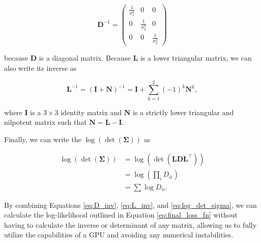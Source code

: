 \begin{equation}
\boldsymbol{D}^{-1}=\left(\begin{array}{ccc}
\frac{1}{\sigma_{1}^{2}} & 0 & 0 \\
0 & \frac{1}{\sigma_{2}^{2}} & 0 \\
0 & 0 & \frac{1}{\sigma_{3}^{2}}
\end{array}\right)
\label{eq:D_inv}
\end{equation}

\noindent
because $\boldsymbol{D}$ is a diagonal matrix. Because $\boldsymbol{L}$ is a lower triangular matrix, we can also write its inverse as  

\begin{equation}
\boldsymbol{L}^{-1}=(\boldsymbol{I}+\boldsymbol{N})^{-1}= \boldsymbol{I} +\sum_{k=1}^{2}(-1)^{k} \boldsymbol{N}^{k} ,
\label{eq:L_inv}
\end{equation}

\noindent
where $\boldsymbol{I}$ is a $3\times3$ identity matrix and $\boldsymbol{N}$ is a strictly lower triangular and nilpotent matrix such that $\boldsymbol{N} = \boldsymbol{L} - \boldsymbol{I}$.

Finally, we can write the $\log (\operatorname{det}(\boldsymbol{\Sigma}))$ as

\begin{equation}
\begin{split}
\log (\operatorname{det}(\boldsymbol{\Sigma})) 
& = \log (\operatorname{det} (\boldsymbol{L}\boldsymbol{D}\boldsymbol{L}^{\top})) \\
& = \log (\prod_i D_{ii}) \\
& = \sum \log D_{ii} .
\end{split}
\label{eq:log_det_sigma}
\end{equation}

\noindent
By combining Equations \ref{eq:D_inv}, \ref{eq:L_inv}, and \ref{eq:log_det_sigma}, we can calculate the log-likelihood outlined in Equation \ref{eq:final_loss_fn} without having to calculate the inverse or determinant of any matrix, allowing us to fully utilize the capabilities of a GPU and avoiding any numerical instabilities. 

